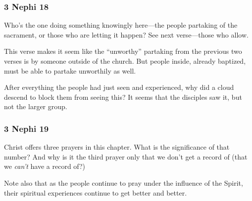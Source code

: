 	\subsubsection{3 Nephi 18} %
	
		\begin{compactdesc}
		
		\item[28$\vert$]
		\begin{compactdesc}
		\item[knowingly] Who's the one doing something knowingly here---the people partaking of the sacrament, or those who are letting it happen? See next verse---those who allow.
		\end{compactdesc}
		
		\item[30$\vert$]
		\begin{compactdesc}
		\item[repents and is baptized] This verse makes it seem like the ``unworthy'' partaking from the previous two verses is by someone outside of the church. But people inside, already baptized, must be able to partake unworthily as well.
		\end{compactdesc}
		
		\item[38--39$\vert$]
		\begin{compactdesc}
		\item[cloud overshadowed them] After everything the people had just seen and experienced, why did a cloud descend to block them from seeing this? It seems that the disciples saw it, but not the larger group.
		\end{compactdesc}
		
		\end{compactdesc}
		
	\subsubsection{3 Nephi 19} %
	
		Christ offers three prayers in this chapter. What is the significance of that number? And why is it the third prayer only that we don't get a record of (that we \textit{can't} have a record of?)
		
		Note also that as the people continue to pray under the influence of the Spirit, their spiritual experiences continue to get better and better.
	
